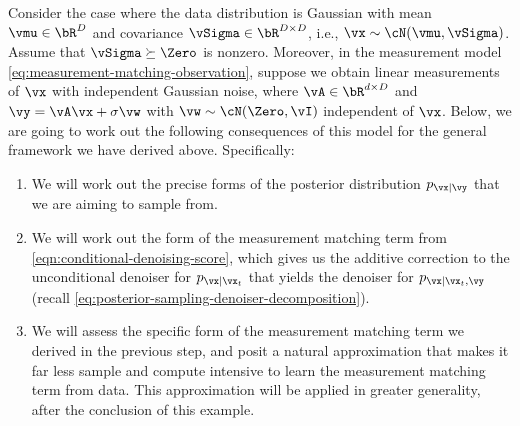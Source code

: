\documentclass[../../book-main.tex]{subfiles}
\begin{document}
\begin{example}\label{example:denoising-conditional-gaussian}
    Consider the case where the data distribution is Gaussian with
    mean $\vmu \in
    \bR^D$ and
    covariance $\vSigma \in \bR^{D \times D}$, i.e., $\vx \sim
    \cN(\vmu, \vSigma)$.
    Assume that $\vSigma \succeq \Zero$ is nonzero.
    Moreover, in the measurement model
    \eqref{eq:measurement-matching-observation},
    suppose we obtain linear measurements of $\vx$ with independent Gaussian
    noise, where $\vA \in \bR^{d \times D}$ and $\vy = \vA \vx + \sigma \vw$
    with $\vw \sim \cN(\Zero, \vI)$ independent of $\vx$.
    Below, we are going to work out the following consequences of this model for
    the general framework we have derived above. Specifically:
    \begin{enumerate}
        \item We will work out the precise forms of the posterior distribution
            $p_{\vx \mid \vy}$ that we are aiming to sample from.
        \item We will work out the form of the measurement matching term from
            \eqref{eqn:conditional-denoising-score}, which gives us the additive
            correction to the unconditional denoiser for $p_{\vx \mid
            \vx_t}$ that
            yields the denoiser for $p_{\vx \mid \vx_t, \vy}$ (recall
            \eqref{eq:posterior-sampling-denoiser-decomposition}).
        \item We will assess the specific form of the measurement
            matching term we
            derived in the previous step, and posit a natural approximation that
            makes it far less sample and compute intensive to learn
            the measurement
            matching term from data. This approximation will be
            applied in greater
            generality, after the conclusion of this example.
    \end{enumerate}


\end{example}
\end{document}
